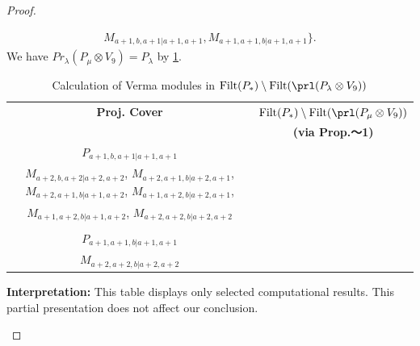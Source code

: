 \begin{proof}
\begin{enumerate}
\begin{enumerate}
\begin{equation}
\begin{aligned}
M_{a+1,b,a+1|a+1,a+1},
M_{a+1,a+1,b|a+1,a+1}
\}. 
  \end{aligned}
\end{equation}
    We have $Pr_{\lambda}(P_\mu \otimes V_{9}) = P_\lambda  $ by \cref{tab:verma-analysis_f_7}.
\begin{table}[htbp]
\centering
\caption{Calculation of Verma modules in $\operatorname{Filt}(P_*) \setminus \operatorname{Filt}(\prl(P_\lambda \otimes V_{9})) $ } \label{tab:verma-analysis_f_7}
\begin{tabular}{cc}
\toprule
\textbf{Proj. Cover} & \textbf{$\operatorname{Filt}(P_*) \setminus \operatorname{Filt}(\prl(P_\mu \otimes V_{9})) $}  \\
     & \textbf{(via Prop.～1)}  \\
\midrule
 $P_{a+1,b,a+1|a+1,a+1}$ & \makecell{
 $M_{a+2,b,a+1|a+2,a+1}$,
 $M_{a+2,b,a+1|a+1,a+2}$,
 $M_{a+1,b,a+2|a+2,a+1}$,
 $M_{a+1,b,a+2|a+1,a+2}$, \\
 $M_{a+2,b,a+2|a+2,a+2}$,
 $M_{a+2,a+1,b|a+2,a+1}$,
 $M_{a+2,a+1,b|a+1,a+2}$,
 $M_{a+1,a+2,b|a+2,a+1}$, \\
 $M_{a+1,a+2,b|a+1,a+2}$,
 $M_{a+2,a+2,b|a+2,a+2}$
}\\
 & \\
 $P_{a+1,a+1,b|a+1,a+1}$ & \makecell{
 $M_{a+2,a+1,b|a+2,a+1}$,
 $M_{a+2,a+1,b|a+1,a+2}$,
 $M_{a+1,a+2,b|a+2,a+1}$,
 $M_{a+1,a+2,b|a+1,a+2}$, \\
 $M_{a+2,a+2,b|a+2,a+2}$
}\\
\bottomrule
\end{tabular}
\vspace{0.5em}
\parbox{\linewidth}{\small
\textbf{Interpretation:}
This table displays only selected computational results. This partial presentation does not affect our conclusion.
}
\end{table}
    \end{enumerate}


\end{enumerate}
\end{proof}
